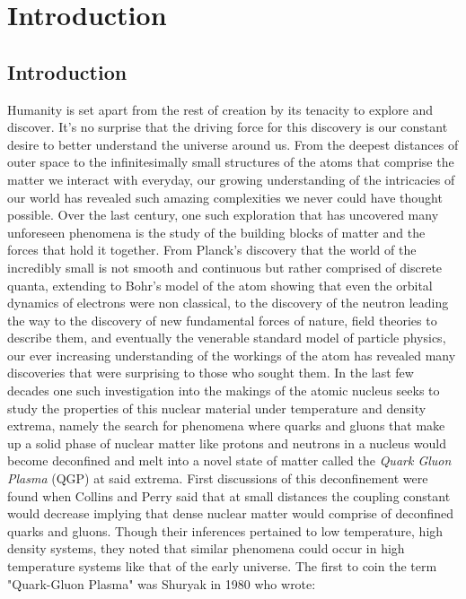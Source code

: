\chapter{Introduction}


\section{Introduction}
Humanity is set apart from the rest of creation by its tenacity to explore and discover. It's no surprise that the driving force for this discovery is our constant desire to better understand the universe around us. From the deepest distances of outer space to the infinitesimally small structures of the atoms that comprise the matter we interact with everyday, our growing understanding of the intricacies of our world has revealed such amazing complexities we never could have thought possible. Over the last century, one such exploration that has uncovered many unforeseen phenomena is the study of the building blocks of matter and the forces that hold it together. From Planck's discovery that the world of the incredibly small is not smooth and continuous but rather comprised of discrete quanta, extending to Bohr's model of the atom showing that even the orbital dynamics of electrons were non classical, to the discovery of the neutron leading the way to the discovery of new fundamental forces of nature, field theories to describe them, and eventually the venerable standard model of particle physics, our ever increasing understanding of the workings of the atom has revealed many discoveries that were surprising to those who sought them. In the last few decades one such investigation into the makings of the atomic nucleus seeks to study the properties of this nuclear material under temperature and density extrema, namely the search for phenomena where quarks and gluons that make up a solid phase of nuclear matter like protons and neutrons in a nucleus would become deconfined and melt into a novel state of matter called the \textit{Quark Gluon Plasma} (QGP) at said extrema. 
First discussions of this deconfinement were found when Collins and Perry \citep{Collins:1974ky} said that at small distances the coupling constant would decrease implying that dense nuclear matter would comprise of deconfined quarks and gluons. Though their inferences pertained to low temperature, high density systems, they noted that similar phenomena could occur in high temperature systems like that of the early universe. The first to coin the term "Quark-Gluon Plasma" was Shuryak in 1980 \citep{Shuryak:1980tp} who wrote: 

